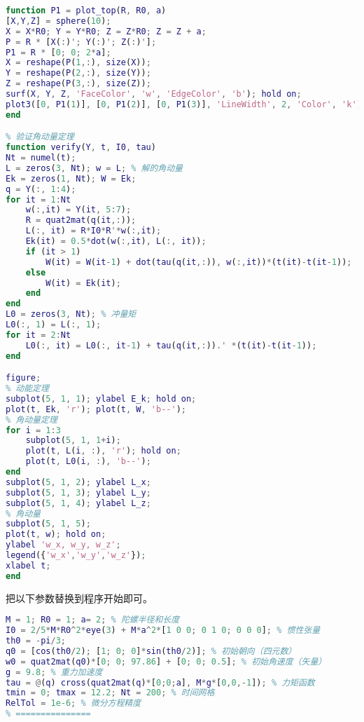 \begin{lstlisting}[language=matlab, caption=top\_sim.m]
% 画陀螺
function P1 = plot_top(R, R0, a)
[X,Y,Z] = sphere(10);
X = X*R0; Y = Y*R0; Z = Z*R0; Z = Z + a;
P = R * [X(:)'; Y(:)'; Z(:)'];
P1 = R * [0; 0; 2*a];
X = reshape(P(1,:), size(X));
Y = reshape(P(2,:), size(Y));
Z = reshape(P(3,:), size(Z));
surf(X, Y, Z, 'FaceColor', 'w', 'EdgeColor', 'b'); hold on;
plot3([0, P1(1)], [0, P1(2)], [0, P1(3)], 'LineWidth', 2, 'Color', 'k');
end

% 验证角动量定理
function verify(Y, t, I0, tau)
Nt = numel(t);
L = zeros(3, Nt); w = L; % 解的角动量
Ek = zeros(1, Nt); W = Ek;
q = Y(:, 1:4);
for it = 1:Nt
    w(:,it) = Y(it, 5:7);
    R = quat2mat(q(it,:));
    L(:, it) = R*I0*R'*w(:,it);
    Ek(it) = 0.5*dot(w(:,it), L(:, it));
    if (it > 1)
        W(it) = W(it-1) + dot(tau(q(it,:)), w(:,it))*(t(it)-t(it-1));
    else
        W(it) = Ek(it);
    end
end
L0 = zeros(3, Nt); % 冲量矩
L0(:, 1) = L(:, 1);
for it = 2:Nt
    L0(:, it) = L0(:, it-1) + tau(q(it,:)).' *(t(it)-t(it-1));
end

figure;
% 动能定理
subplot(5, 1, 1); ylabel E_k; hold on;
plot(t, Ek, 'r'); plot(t, W, 'b--');
% 角动量定理
for i = 1:3
    subplot(5, 1, 1+i);
    plot(t, L(i, :), 'r'); hold on;
    plot(t, L0(i, :), 'b--');
end
subplot(5, 1, 2); ylabel L_x;
subplot(5, 1, 3); ylabel L_y;
subplot(5, 1, 4); ylabel L_z;
% 角动量
subplot(5, 1, 5);
plot(t, w); hold on;
ylabel 'w_x, w_y, w_z';
legend({'w_x','w_y','w_z'});
xlabel t;
end
\end{lstlisting}

把以下参数替换到程序开始即可。
\begin{lstlisting}[language=matlab]
% === 参数设置 ===
M = 1; R0 = 1; a= 2; % 陀螺半径和长度
I0 = 2/5*M*R0^2*eye(3) + M*a^2*[1 0 0; 0 1 0; 0 0 0]; % 惯性张量
th0 = -pi/3;
q0 = [cos(th0/2); [1; 0; 0]*sin(th0/2)]; % 初始朝向（四元数）
w0 = quat2mat(q0)*[0; 0; 97.86] + [0; 0; 0.5]; % 初始角速度（矢量）
g = 9.8; % 重力加速度
tau = @(q) cross(quat2mat(q)*[0;0;a], M*g*[0,0,-1]); % 力矩函数
tmin = 0; tmax = 12.2; Nt = 200; % 时间网格
RelTol = 1e-6; % 微分方程精度
% ===============
\end{lstlisting}
